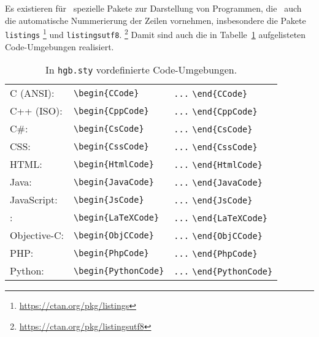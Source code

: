 Es existieren für \latex\ spezielle Pakete zur Darstellung von Programmen, die \ua\ auch die automatische
Nummerierung der Zeilen vornehmen, insbesondere die Pakete \texttt{listings}%
\footnote{\url{https://ctan.org/pkg/listings}}
und \texttt{listingsutf8}.%
\footnote{\url{https://ctan.org/pkg/listingsutf8}}
Damit sind auch die in Tabelle~\ref{tab:CodeUmgebungen} aufgelisteten Code-Umgebungen realisiert.
%
\begin{table}
\caption{In \nolinkurl{hgb.sty} vordefinierte Code-Umgebungen.}
\label{tab:CodeUmgebungen}
\centering
\begin{tabular}{@{}lll@{}}
	\toprule
	C (ANSI): & \verb!\begin{CCode}! & \verb!...! \verb!\end{CCode}! \\
	C++ (ISO): & \verb!\begin{CppCode}! & \verb!...! \verb!\end{CppCode}! \\
	C\#: & \verb!\begin{CsCode}! & \verb!...! \verb!\end{CsCode}! \\
	CSS: & \verb!\begin{CssCode}! & \verb!...! \verb!\end{CssCode}! \\
	HTML: & \verb!\begin{HtmlCode}! & \verb!...! \verb!\end{HtmlCode}! \\
	Java: & \verb!\begin{JavaCode}! & \verb!...! \verb!\end{JavaCode}! \\
	JavaScript: & \verb!\begin{JsCode}! & \verb!...! \verb!\end{JsCode}! \\
	\latex: & \verb!\begin{LaTeXCode}! & \verb!...! \verb!\end{LaTeXCode}! \\
	Objective-C: & \verb!\begin{ObjCCode}! & \verb!...! \verb!\end{ObjCCode}! \\
	PHP: & \verb!\begin{PhpCode}! & \verb!...! \verb!\end{PhpCode}! \\
	Python: & \verb!\begin{PythonCode}! & \verb!...! \verb!\end{PythonCode}! \\

\end{tabular}
\end{table}
